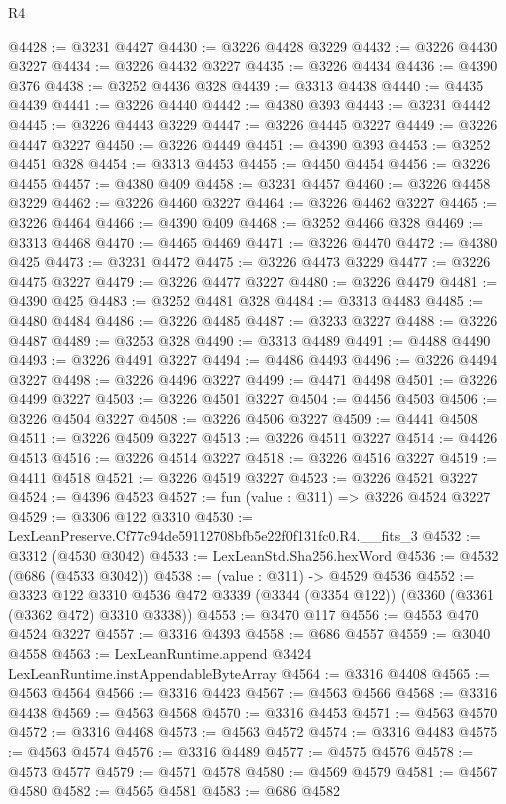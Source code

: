 \begin{lexlean}{R4}
\begin{coremodule}
@4428 := @3231 @4427
@4430 := @3226 @4428 @3229
@4432 := @3226 @4430 @3227
@4434 := @3226 @4432 @3227
@4435 := @3226 @4434
@4436 := @4390 @376
@4438 := @3252 @4436 @328
@4439 := @3313 @4438
@4440 := @4435 @4439
@4441 := @3226 @4440
@4442 := @4380 @393
@4443 := @3231 @4442
@4445 := @3226 @4443 @3229
@4447 := @3226 @4445 @3227
@4449 := @3226 @4447 @3227
@4450 := @3226 @4449
@4451 := @4390 @393
@4453 := @3252 @4451 @328
@4454 := @3313 @4453
@4455 := @4450 @4454
@4456 := @3226 @4455
@4457 := @4380 @409
@4458 := @3231 @4457
@4460 := @3226 @4458 @3229
@4462 := @3226 @4460 @3227
@4464 := @3226 @4462 @3227
@4465 := @3226 @4464
@4466 := @4390 @409
@4468 := @3252 @4466 @328
@4469 := @3313 @4468
@4470 := @4465 @4469
@4471 := @3226 @4470
@4472 := @4380 @425
@4473 := @3231 @4472
@4475 := @3226 @4473 @3229
@4477 := @3226 @4475 @3227
@4479 := @3226 @4477 @3227
@4480 := @3226 @4479
@4481 := @4390 @425
@4483 := @3252 @4481 @328
@4484 := @3313 @4483
@4485 := @4480 @4484
@4486 := @3226 @4485
@4487 := @3233 @3227
@4488 := @3226 @4487
@4489 := @3253 @328
@4490 := @3313 @4489
@4491 := @4488 @4490
@4493 := @3226 @4491 @3227
@4494 := @4486 @4493
@4496 := @3226 @4494 @3227
@4498 := @3226 @4496 @3227
@4499 := @4471 @4498
@4501 := @3226 @4499 @3227
@4503 := @3226 @4501 @3227
@4504 := @4456 @4503
@4506 := @3226 @4504 @3227
@4508 := @3226 @4506 @3227
@4509 := @4441 @4508
@4511 := @3226 @4509 @3227
@4513 := @3226 @4511 @3227
@4514 := @4426 @4513
@4516 := @3226 @4514 @3227
@4518 := @3226 @4516 @3227
@4519 := @4411 @4518
@4521 := @3226 @4519 @3227
@4523 := @3226 @4521 @3227
@4524 := @4396 @4523
@4527 := fun (value : @311) => @3226 @4524 @3227
@4529 := @3306 @122 @3310
@4530 := LexLeanPreserve.Cf77c94de59112708bfb5e22f0f131fc0.R4.__fits_3
@4532 := @3312 (@4530 @3042)
@4533 := LexLeanStd.Sha256.hexWord
@4536 := @4532 (@686 (@4533 @3042))
@4538 := (value : @311) -> @4529 @4536
@4552 := @3323
    @122
    @3310
    @4536
    @472
    @3339
    (@3344 (@3354 @122))
    (@3360 (@3361 (@3362 @472) @3310 @3338))
@4553 := @3470 @117
@4556 := @4553 @470 @4524 @3227
@4557 := @3316 @4393
@4558 := @686 @4557
@4559 := @3040 @4558
@4563 := LexLeanRuntime.append @3424 LexLeanRuntime.instAppendableByteArray
@4564 := @3316 @4408
@4565 := @4563 @4564
@4566 := @3316 @4423
@4567 := @4563 @4566
@4568 := @3316 @4438
@4569 := @4563 @4568
@4570 := @3316 @4453
@4571 := @4563 @4570
@4572 := @3316 @4468
@4573 := @4563 @4572
@4574 := @3316 @4483
@4575 := @4563 @4574
@4576 := @3316 @4489
@4577 := @4575 @4576
@4578 := @4573 @4577
@4579 := @4571 @4578
@4580 := @4569 @4579
@4581 := @4567 @4580
@4582 := @4565 @4581
@4583 := @686 @4582

\end{coremodule}
\end{lexlean}
